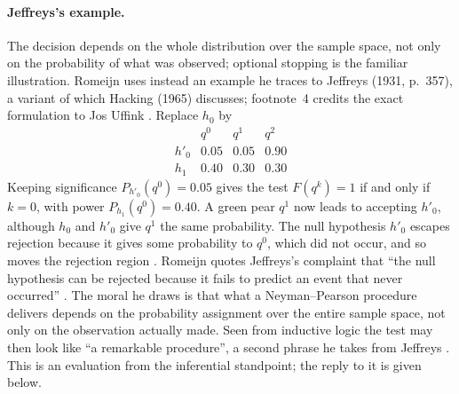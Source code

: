 \paragraph{Jeffreys's example.}
The decision depends on the whole distribution over the sample space,
not only on the probability of what was observed; optional stopping is
the familiar illustration. Romeijn uses instead an example he traces to
Jeffreys (1931, p.~357), a variant of which Hacking (1965) discusses;
footnote~4 credits the exact formulation to Jos Uffink
\cite[p.~639 and n.~4]{Romeijn2011InductiveLogicStatistics}. Replace
\(h_0\) by
\[
 \begin{array}{c|ccc}
  & q^0 & q^1 & q^2\\\hline
  h'_0 & 0.05 & 0.05 & 0.90\\
  h_1 & 0.40 & 0.30 & 0.30
 \end{array}
\]
Keeping significance \(P_{h'_0}(q^0)=0.05\) gives the test
\(F(q^k)=1\) if and only if \(k=0\), with power \(P_{h_1}(q^0)=0.40\). A
green pear \(q^1\) now leads to accepting \(h'_0\), although \(h_0\)
and \(h'_0\) give \(q^1\) the same probability. The null hypothesis
\(h'_0\) escapes rejection because it gives some probability to
\(q^0\), which did not occur, and so moves the rejection region
\cite[p.~640]{Romeijn2011InductiveLogicStatistics}. Romeijn quotes
Jeffreys's complaint that ``the null hypothesis can be rejected because
it fails to predict an event that never occurred''
\cite[p.~640]{Romeijn2011InductiveLogicStatistics}. The moral he draws
is that what a Neyman--Pearson procedure delivers depends on the
probability assignment over the entire sample space, not only on the
observation actually made. Seen from inductive logic the test may then
look like ``a remarkable procedure'', a second phrase he takes from
Jeffreys \cite[p.~640]{Romeijn2011InductiveLogicStatistics}. This is an
evaluation from the inferential standpoint; the reply to it is given
below.

